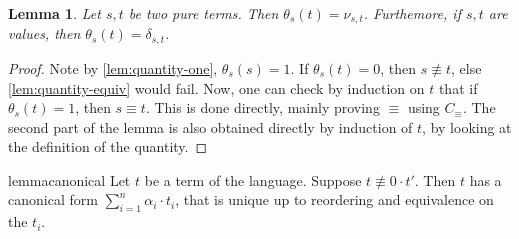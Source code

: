 \documentclass[10pt,a4paper]{article}
\newcommand{\equivcontext}{\ensuremath{C_\equiv}}
\newcommand\kron[2]{\delta_{#1, #2}}
\newcommand{\qt}[2]{\theta_{#1}(#2)}
\newcommand{\kroneq}[2]{\nu_{#1, #2}}
\newtheorem{lemma}[theorem]{Lemma}
\begin{document}
\begin{lemma}\label{lem:quantity-pure}
  Let $s, t$ be two pure terms.
  Then $\qt s t = \kroneq s t$.
  Furthemore, if $s, t$ are values, then $\qt s t = \kron s t$.
\end{lemma}

\begin{proof}
  Note by \autoref{lem:quantity-one}, $\qt s s = 1$.
  If $\qt s t = 0$, then $s \not\equiv t$, else
  \autoref{lem:quantity-equiv} would fail.
  Now, one can check by induction on $t$ that if $\qt s t = 1$, then
  $s \equiv t$.
  This is done directly, mainly proving $\equiv$ using $\equivcontext$.
  The second part of the lemma is also obtained directly by induction
  of $t$, by looking at the definition of the quantity. \qedhere
\end{proof}

\begin{restatable}{lemma}{canonical}
  \label{lem:canonical}
  Let $t$ be a term of the language. Suppose $t \not\equiv 0 \cdot t'$.
  Then $t$ has a canonical form $\sum_{i=1}^n \alpha_i \cdot t_i$,
  that is unique up to reordering and equivalence on the $t_i$.
\end{restatable}
\end{document}
